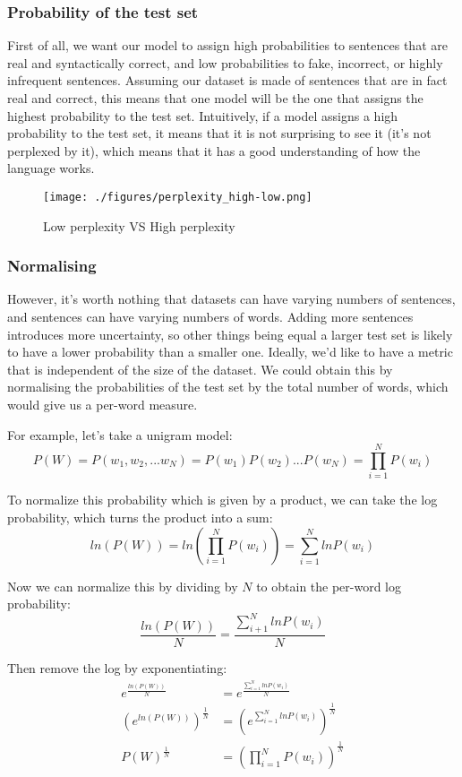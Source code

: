 \subsubsection{Probability of the test set}
First of all, we want our model to assign high probabilities to sentences that are real and syntactically correct, and low probabilities to fake, incorrect, or highly infrequent sentences. Assuming our dataset is made of sentences that are in fact real and correct, this means that one model will be the one that assigns the highest probability to the test set. Intuitively, if a model assigns a high probability to the test set, it means that it is not surprising to see it (it's not perplexed by it), which means that it has a good understanding of how the language works.

\begin{figure}[h]			%
	\centering
	\texttt{[image: ./figures/perplexity\_high-low.png]}	
	\caption{Low perplexity VS High perplexity}
\end{figure}

\subsubsection{Normalising}
However, it's worth nothing that datasets can have varying numbers of sentences, and sentences can have varying numbers of words. Adding more sentences introduces more uncertainty, so other things being equal a larger test set is likely to have a lower probability than a smaller one. Ideally, we'd like to have a metric that is independent of the size of the dataset. We could obtain this by normalising the probabilities of the test set by the total number of words, which would give us a per-word measure.

For example, let's take a unigram model:
$$
	P(W) = P(w_1,w_2,...w_N) = P(w_1)P(w_2)...P(w_N) = \prod_{i =1}^N P(w_i)
$$

To normalize this probability which is given by a product, we can take the log probability, which turns the product into a sum:
$$
	ln(P(W))=ln(\prod_{i=1}^N P(w_i))=\sum_{i=1}^N lnP(w_i)
$$

Now we can normalize this by dividing by $N$ to obtain the per-word log probability:
$$
	\frac{ln(P(W))}{N} = \frac{\sum_{i+1}^N lnP(w_i)}{N}
$$

Then remove the log by exponentiating:
$$	\begin{aligned}
		e^{\frac{ln(P(W))}{N}} &= e^{\frac{\sum_{i=1}^N lnP(w_i)}{N}}\\
		(e^{ln(P(W))})^{\frac{1}{N}} &= (e^{\sum_{i=1}^N lnP(w_i)})^{\frac{1}{N}}\\
		P(W)^{\frac{1}{N}} &= (\prod_{i=1}^N P(w_i))^{\frac{1}{N}}
	\end{aligned}
$$

